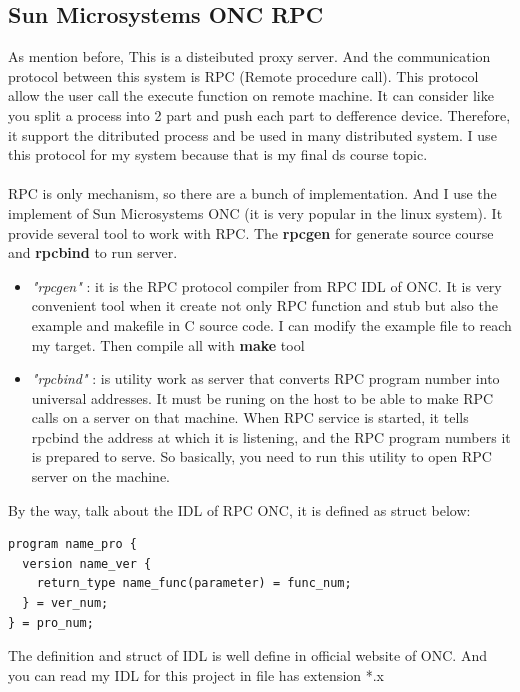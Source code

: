 \documentclass{article}
\begin{document}
\subsection{Sun Microsystems ONC RPC}
As mention before, This is a disteibuted proxy server. And the communication protocol
between this system is RPC (Remote procedure call). This protocol allow the user call
the execute function on remote machine. It can consider like you split a process into
2 part and push each part to defference device. Therefore, it support the ditributed 
process and be used in many distributed system. I use this protocol for my system because
that is my final ds course topic.\\
\\
RPC is only mechanism, so there are a bunch of implementation. And I use the implement of
Sun Microsystems ONC (it is very popular in the linux system). It provide several tool to
work with RPC. The \textbf{rpcgen} for generate source course and \textbf{rpcbind} to run
server.
\begin{itemize}
\item \emph{"rpcgen"} : it is the RPC protocol compiler from RPC IDL of ONC. It is very
convenient tool when it create not only RPC function and stub but also the example and
makefile in C source code. I can modify the example file to reach my target. Then compile
all with \textbf{make} tool
\item \emph{"rpcbind"} : is utility work as server that converts RPC program number into
universal addresses. It must be runing on the host to be able to make RPC calls on a server
on that machine. When RPC service is started, it tells rpcbind the address at which it is
listening, and the RPC program numbers it is prepared to serve. So basically, you need to 
run this utility to open RPC server on the machine.
\end{itemize}
By the way, talk about the IDL of RPC ONC, it is defined as struct below:
\begin{verbatim}
program name_pro {
  version name_ver {
    return_type name_func(parameter) = func_num;
  } = ver_num;
} = pro_num;
\end{verbatim}
The definition and struct of IDL is well define in official website of ONC.
And you can read my IDL for this project in file has extension *.x
\end{document}
